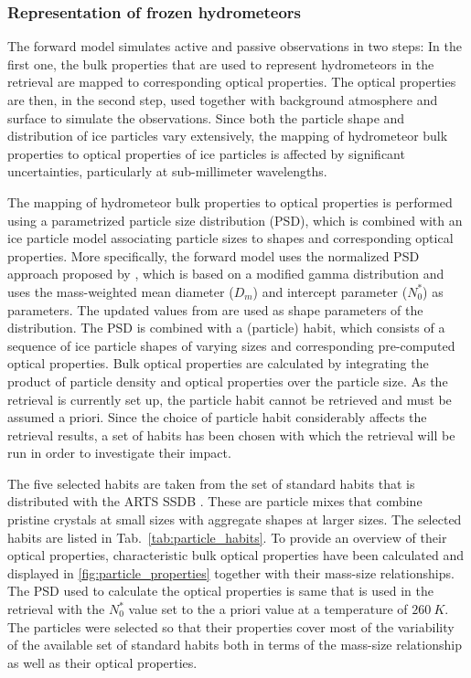 \documentclass[journal abbreviation, manuscript]{copernicus}
\begin{document}
\subsubsection{Representation of frozen hydrometeors}

The forward model simulates active and passive observations in two steps: In the
first one, the bulk properties that are used to represent hydrometeors in the
retrieval are mapped to corresponding optical properties. The optical properties
are then, in the second step, used together with background atmosphere and
surface to simulate the observations. Since both the particle shape and
distribution of ice particles vary extensively, the mapping of hydrometeor bulk
properties to optical properties of ice particles is affected by significant
uncertainties, particularly at sub-millimeter wavelengths.

The mapping of hydrometeor bulk properties to optical properties is performed
using a parametrized particle size distribution (PSD), which is combined with an
ice particle model associating particle sizes to shapes and corresponding
optical properties. More specifically, the forward model uses the normalized PSD
approach proposed by \citet{delanoe05}, which is based on a modified gamma
distribution and uses the mass-weighted mean diameter ($D_m$) and intercept
parameter ($N_0^*$) as parameters. The updated values from \citet{cazenave19}
are used as shape parameters of the distribution. The PSD is combined with a
(particle) habit, which consists of a sequence of ice particle shapes of varying
sizes and corresponding pre-computed optical properties. Bulk optical properties
are calculated by integrating the product of particle density and optical
properties over the particle size. As the retrieval is currently set up, the
particle habit cannot be retrieved and must be assumed a priori. Since the
choice of particle habit considerably affects the retrieval results, a set of
habits has been chosen with which the retrieval will be run in order to
investigate their impact.

The five selected habits are taken from the set of standard habits that is
distributed with the ARTS SSDB \citep{eriksson18}. These are particle mixes that
combine pristine crystals at small sizes with aggregate shapes at larger sizes.
The selected habits are listed in Tab.~\ref{tab:particle_habits}. To provide an
overview of their optical properties, characteristic bulk optical properties
have been calculated and displayed in \ref{fig:particle_properties} together
with their mass-size relationships. The PSD used to calculate the optical
properties is same that is used in the retrieval with the $N_0^*$ value set to
the a priori value at a temperature of $260\ \unit{K}$. The particles were
selected so that their properties cover most of the variability of the available
set of standard habits both in terms of the mass-size relationship as well as
their optical properties.
\end{document}
